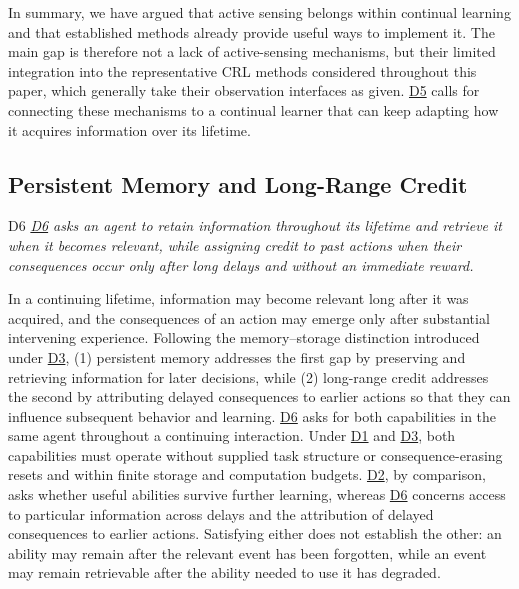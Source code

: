 \documentclass[10pt,journal,compsoc]{IEEEtran}
\DeclareRobustCommand{\Dref}[1]{\hyperref[sec:d#1]{D#1}}
\begin{document}
In summary, we have argued that active sensing belongs within continual learning and that established methods already provide useful ways to implement it.
The main gap is therefore not a lack of active-sensing mechanisms, but their limited integration into the representative CRL methods considered throughout this paper, which generally take their observation interfaces as given.
\Dref{5} calls for connecting these mechanisms to a continual learner that can keep adapting how it acquires information over its lifetime.

\subsection{Persistent Memory and Long-Range Credit}
\label{sec:d6}

\begin{briefbox}[behaviorbrief]{D6}
    \emph{\Dref{6} asks an agent to retain information throughout its lifetime and retrieve it when it becomes relevant, while assigning credit to past actions when their consequences occur only after long delays and without an immediate reward.}
\end{briefbox}

\noindent In a continuing lifetime, information may become relevant long after it was acquired, and the consequences of an action may emerge only after substantial intervening experience.
Following the memory--storage distinction introduced under \Dref{3}, (1) persistent memory addresses the first gap by preserving and retrieving information for later decisions, while (2) long-range credit addresses the second by attributing delayed consequences to earlier actions so that they can influence subsequent behavior and learning.
\Dref{6} asks for both capabilities in the same agent throughout a continuing interaction.
Under \Dref{1} and \Dref{3}, both capabilities must operate without supplied task structure or consequence-erasing resets and within finite storage and computation budgets.
\Dref{2}, by comparison, asks whether useful abilities survive further learning, whereas \Dref{6} concerns access to particular information across delays and the attribution of delayed consequences to earlier actions.
Satisfying either does not establish the other: an ability may remain after the relevant event has been forgotten, while an event may remain retrievable after the ability needed to use it has degraded.
\end{document}
